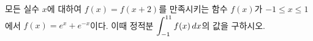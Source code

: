 모든 실수 $x$에 대하여 $f(x)=f(x+2)$를 만족시키는 함수 $f(x)$가 $-1\le x\le 1$에서 $f(x)=e^x+e^{-x}$이다. 이때 정적분 $\displaystyle\int_{-1}^{11}f(x)\mkern3mu dx$의 값을 구하시오.
